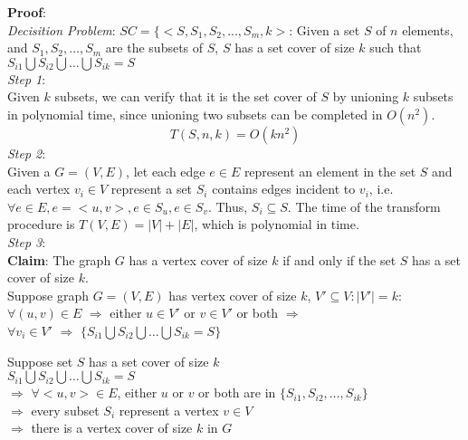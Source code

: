 \documentclass{article}%
\begin{document}
\begin{enumerate}
  \textbf{Proof}:\\
  \emph{Decisition Problem}: $SC=\{<S,S_{1},S_{2},...,S_{m},k>$: Given a set $S$ of $n$ elements, and $S_{1},S_{2},\ldots,S_{m}$ are the subsets of $S$, $S$ has a set cover of size $k$ such that $S_{i1} \bigcup S_{i2} \bigcup \ldots \bigcup S_{ik}=S$\\
  
  \emph{Step 1}:\\
  Given $k$ subsets, we can verify that it is the set cover of $S$ by unioning $k$ subsets in polynomial time, since unioning two subsets can be completed in $O(n^{2})$.
  $$T(S,n,k) = O(kn^{2})$$
  \emph{Step 2}:\\
  Given a $G=(V,E)$, let each edge $e \in E$ represent an element in the set $S$ and each vertex $v_{i} \in V$ represent a set $S_{i}$ contains edges incident to $v_{i}$, i.e. $\forall e \in E, e=<u,v>, e \in S_{u}, e \in S_{v} $. Thus, $S_{i} \subseteq S$. The time of the transform procedure is $T(V,E) = |V| + |E|$, which is polynomial in time.\\
  
  \emph{Step 3}:\\
  \textbf{Claim}: The graph $G$ has a vertex cover of size $k$ if and only if the set $S$ has a set cover of size $k$.\\
  Suppose graph $G=(V,E)$ has vertex cover of size $k$, $V' \subseteq V:|V'|=k$:\\
  $\forall (u,v) \in E$ $\Rightarrow$ either $u \in V'$ or $v \in V'$ or both $\Rightarrow$ \\ 
  $\forall v_{i} \in V'$ $\Rightarrow$  $\{S_{i1} \bigcup S_{i2} \bigcup \ldots \bigcup S_{ik}=S\}$ 
  
  Suppose set $S$ has a set cover of size $k$\\
  $S_{i1} \bigcup S_{i2} \bigcup \ldots \bigcup S_{ik}=S$ \\ 
  $\Rightarrow$ $\forall <u,v> \in E$, either $u$ or $v$ or both are in $\{S_{i1}, S_{i2},\ldots,S_{ik}\}$ \\
  $\Rightarrow$ every subset $S_{i}$ represent a vertex $v \in V$\\
  $\Rightarrow$ there is a vertex cover of size $k$ in $G$ 
  

\end{enumerate}
\end{document}
